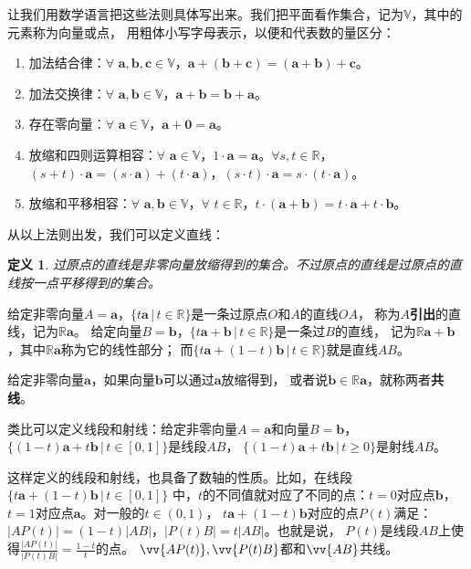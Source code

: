 \documentclass[12pt,UTF8]{ctexbook}
\newtheorem{df}{定义}[section]
\begin{document}
让我们用数学语言把这些法则具体写出来。我们把平面看作集合，记为$\mathbb{V}$，其中的元素称为向量或点，
用粗体小写字母表示，以便和代表数的量区分：
\begin{enumerate}
    \item 加法结合律：$\forall \,\, \mathbf{a}, \mathbf{b}, \mathbf{c} \in \mathbb{V}$，$\mathbf{a}+ (\mathbf{b} + \mathbf{c}) = (\mathbf{a} + \mathbf{b}) + \mathbf{c}$。
    \item 加法交换律：$\forall \,\, \mathbf{a}, \mathbf{b} \in \mathbb{V}$，$\mathbf{a} + \mathbf{b} = \mathbf{b} + \mathbf{a}$。
    \item 存在零向量：$\forall \,\, \mathbf{a} \in \mathbb{V}$，$\mathbf{a} + \mathbf{0} = \mathbf{a}$。
    \item 放缩和四则运算相容：$\forall \,\, \mathbf{a} \in \mathbb{V}$，$1\cdot \mathbf{a} = \mathbf{a}$。$\forall s, t \in \mathbb{R}$，$(s + t)\cdot\mathbf{a} = (s\cdot\mathbf{a}) + (t\cdot\mathbf{a})$，$(s \cdot t)\cdot \mathbf{a} = s \cdot (t\cdot \mathbf{a})$。
    \item 放缩和平移相容：$\forall \,\, \mathbf{a}, \mathbf{b} \in \mathbb{V}$，$\forall \,\, t \in \mathbb{R}$，$t\cdot(\mathbf{a} + \mathbf{b}) = t\cdot\mathbf{a} + t\cdot\mathbf{b}$。
\end{enumerate}

从以上法则出发，我们可以定义直线：
\begin{df}
    过原点的直线是非零向量放缩得到的集合。不过原点的直线是过原点的直线按一点平移得到的集合。
\end{df}
给定非零向量$A = \mathbf{a}$，$ \{t\mathbf{a} \, | \, t\in\mathbb{R}\}$是一条过原点$O$和$A$的直线$OA$，
称为$A$\textbf{引出}的直线，记为$\mathbb{R}\mathbf{a}$。
给定向量$B = \mathbf{b}$，$ \{t\mathbf{a}+\mathbf{b} \, | \, t\in\mathbb{R}\}$是一条过$B$的直线，
记为$\mathbb{R}\mathbf{a}+\mathbf{b}$，其中$\mathbb{R}\mathbf{a}$称为它的线性部分；
而$ \{t\mathbf{a}+(1 - t)\mathbf{b} \, | \, t\in\mathbb{R}\}$就是直线$AB$。

给定非零向量$\mathbf{a}$，如果向量$\mathbf{b}$可以通过$\mathbf{a}$放缩得到，
或者说$\mathbf{b}\in \mathbb{R}\mathbf{a}$，就称两者\textbf{共线}。

类比可以定义线段和射线：给定非零向量$A = \mathbf{a}$和向量$B =\mathbf{b}$，
$ \{(1 - t)\mathbf{a}+t\mathbf{b} \, | \, t\in [0, 1]\}$是线段$AB$，
$ \{(1 - t)\mathbf{a}+t\mathbf{b} \, | \, t \geqslant 0 \}$是射线$AB$。

这样定义的线段和射线，也具备了数轴的性质。比如，在线段$\{t\mathbf{a}+(1 - t)\mathbf{b} \, | \, t\in [0, 1]\}$
中，$t$的不同值就对应了不同的点：$t = 0$对应点$\mathbf{b}$，$t=1$对应点$\mathbf{a}$。对一般的$t\in (0, 1)$，
$t\mathbf{a}+(1 - t)\mathbf{b}$对应的点$P(t)$满足：$|AP(t)| = (1 - t)|AB|$，$|P(t)B| = t|AB|$。也就是说，
$P(t)$是线段$AB$上使得$ \frac{|AP(t)|}{|P(t)B|} = \frac{1 - t}{t}$的点。
$\vv{AP(t)}, \vv{P(t)B}$都和$\vv{AB}$共线。
\end{document}
